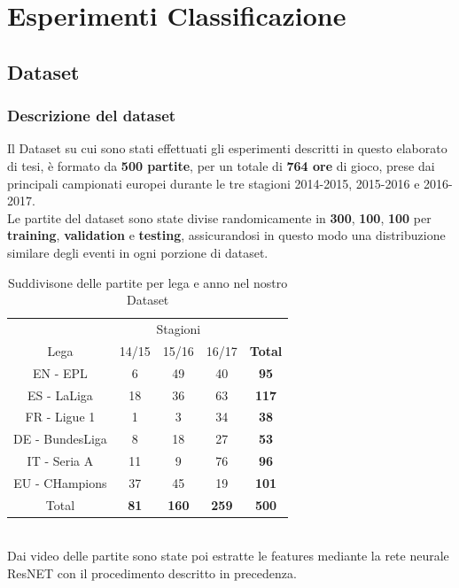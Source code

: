 \chapter{Esperimenti Classificazione}\label{ch:chapter2}
\section{Dataset \cite{soccerNet}}
\subsection{Descrizione del dataset }
Il Dataset su cui sono stati effettuati gli esperimenti descritti in questo elaborato di tesi, è formato da \textbf{500 partite}, per un totale di \textbf{764 ore} di gioco, prese dai principali campionati europei durante le tre stagioni 2014-2015, 2015-2016 e 2016-2017.
\\Le partite del dataset sono state divise randomicamente in \textbf{300}, \textbf{100}, \textbf{100} per \textbf{training}, \textbf{validation} e \textbf{testing}, assicurandosi in questo modo una distribuzione similare degli eventi in ogni porzione di dataset.
\begin{table}[ht]
\caption{Suddivisone delle partite per lega e anno nel nostro Dataset}
\centering
\begin{tabular}{c| | c|c|c | | c}
\multicolumn{1}{c}{}&\multicolumn{3}{c}{Stagioni}& \\
Lega & 14/15 & 15/16 & 16/17 & \textbf{Total} \\
\hline
EN - EPL & 6 & 49 & 40 & \textbf{95} \\
ES - LaLiga & 18 & 36 & 63 & \textbf{117} \\
FR - Ligue 1 & 1 &  3 & 34 & \textbf{38} \\
DE - BundesLiga & 8 & 18 & 27 & \textbf{53} \\
IT - Seria A & 11 & 9 & 76 & \textbf{96} \\
EU - CHampions & 37 & 45 & 19 & \textbf{101} \\
\hline
Total & \textbf{81} & \textbf{160} & \textbf{259} & \textbf{500} \\ [1ex]

\end{tabular}
\label{table: Dataset}
\end{table}
\\Dai video delle partite sono state poi estratte le features mediante la rete neurale ResNET con il procedimento descritto in precedenza.
